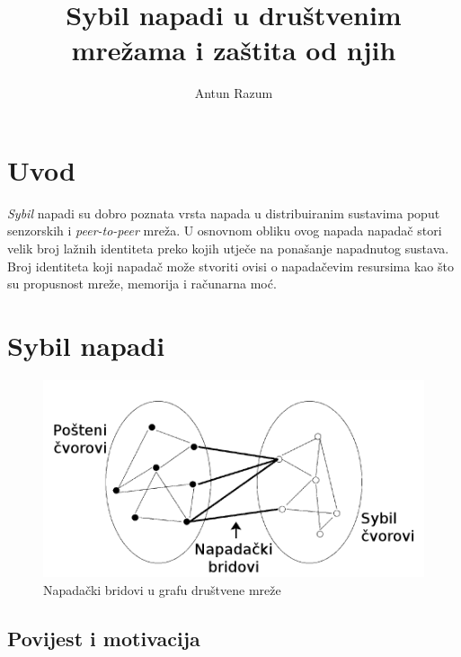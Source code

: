 \documentclass[times, utf8, seminar, numeric]{fer}
\begin{document}
\title{Sybil napadi u društvenim mrežama i zaštita od njih}
\author{Antun Razum}

\maketitle

\tableofcontents

\chapter{Uvod}
\textit{Sybil} napadi  su dobro poznata vrsta napada u distribuiranim sustavima poput senzorskih i \textit{peer-to-peer} mreža. U osnovnom obliku ovog napada napadač stori velik broj lažnih identiteta preko kojih utječe na ponašanje napadnutog sustava. Broj identiteta koji napadač može stvoriti ovisi o napadačevim resursima kao što su propusnost mreže, memorija i računarna moć.


\chapter{Sybil napadi}
\begin{figure}[h]
	\centering
	\includegraphics[scale=0.3]{attack.png}
	\caption{Napadački bridovi u grafu društvene mreže}
	\label{fig:attack}
\end{figure}


\section{Povijest i motivacija}
\end{document}
